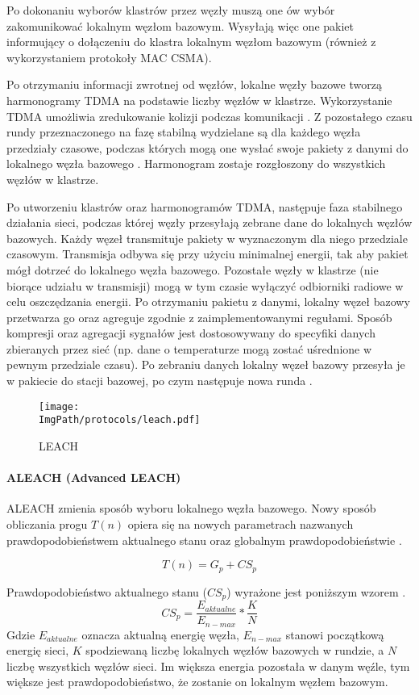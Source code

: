 Po dokonaniu wyborów klastrów przez węzły muszą one ów wybór zakomunikować lokalnym węzłom bazowym. Wysyłają więc one pakiet informujący o dołączeniu do klastra lokalnym węzłom bazowym (również z wykorzystaniem protokoły MAC CSMA).

Po otrzymaniu informacji zwrotnej od węzłów, lokalne węzły bazowe tworzą harmonogramy TDMA na podstawie liczby węzłów w klastrze. Wykorzystanie TDMA umożliwia zredukowanie kolizji podczas komunikacji \cite{Ilyas2004, Ergen2010}. Z pozostałego czasu rundy przeznaczonego na fazę stabilną wydzielane są dla każdego węzła przedziały czasowe, podczas których mogą one wysłać swoje pakiety z danymi do lokalnego węzła bazowego \cite{Cionca2008}. Harmonogram zostaje rozgłoszony do wszystkich węzłów w klastrze.

Po utworzeniu klastrów oraz harmonogramów TDMA, następuje faza stabilnego działania sieci, podczas której węzły przesyłają zebrane dane do lokalnych węzłów bazowych. Każdy węzeł transmituje pakiety w wyznaczonym dla niego przedziale czasowym. Transmisja odbywa się przy użyciu minimalnej energii, tak aby pakiet mógł dotrzeć do lokalnego węzła bazowego. Pozostałe węzły w klastrze (nie biorące udziału w transmisji) mogą w tym czasie wyłączyć odbiorniki radiowe w celu oszczędzania energii. Po otrzymaniu pakietu z danymi, lokalny węzeł bazowy przetwarza go oraz agreguje zgodnie z zaimplementowanymi regułami. Sposób kompresji oraz agregacji sygnałów jest dostosowywany do specyfiki danych zbieranych przez sieć (np. dane o temperaturze mogą zostać uśrednione w pewnym przedziale czasu). Po zebraniu danych lokalny węzeł bazowy przesyła je w pakiecie do stacji bazowej, po czym następuje nowa runda \cite{Yadav2014}.
\begin{figure}[H]
	\begin{center}
		\texttt{[image: \\ImgPath/protocols/leach.pdf]}
	\end{center}
	\caption{LEACH}
\end{figure}
\paragraph{ALEACH (Advanced LEACH)} \label{para:aleach}
ALEACH zmienia sposób wyboru lokalnego węzła bazowego. Nowy sposób obliczania progu $T(n)$ opiera się na nowych parametrach nazwanych prawdopodobieństwem aktualnego stanu oraz globalnym prawdopodobieństwie \cite{Ali2008}.

\[
	T(n) = G_{p} + CS_{p}
\]

Prawdopodobieństwo aktualnego stanu ($CS_{p}$) wyrażone jest poniższym wzorem \cite{Ali2008}.
\[
	CS_{p} = \frac{E_{aktualne}}{E_{n-max}}*\frac{K}{N}
\]
Gdzie $E_{aktualne}$ oznacza aktualną energię węzła, $E_{n-max}$ stanowi początkową energię sieci, $K$ spodziewaną liczbę lokalnych węzłów bazowych w rundzie, a $N$ liczbę wszystkich węzłów sieci. Im większa energia pozostała w danym węźle, tym większe jest prawdopodobieństwo, że zostanie on lokalnym węzłem bazowym.

